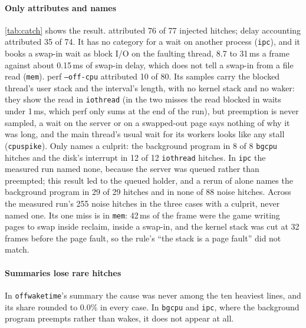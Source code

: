 \paragraph{Only \sys attributes and names} \autoref{tab:catch} shows the
result. \sys attributed 76 of 77 injected hitches; delay accounting
attributed 35 of 74. It has no category for a wait on another process
(\texttt{ipc}), and it books a swap-in wait as block I/O on the faulting
thread, 8.7 to 31\,ms a frame against about 0.15\,ms of swap-in delay, which
does not tell a swap-in from a file read (\texttt{mem}). perf
\texttt{--off-cpu} attributed 10 of 80. Its samples carry the blocked
thread's user stack and the interval's length, with no kernel stack and no
waker: they show the read in \texttt{iothread} (in the two misses the read
blocked in waits under 1\,ms, which perf only sums at the end of the run),
but preemption is never sampled, a wait on the server or on a swapped-out
page says nothing of why it was long, and the main thread's usual wait for
its workers looks like any stall (\texttt{cpuspike}). Only \sys names a
culprit: the background program in 8 of 8 \texttt{bgcpu} hitches and the
disk's interrupt in 12 of 12 \texttt{iothread} hitches. In \texttt{ipc} the
measured run named none, because the server was queued rather than
preempted; this result led to the queued holder, and a rerun of \sys alone
names the background program in 29 of 29 hitches and in none of 88 noise
hitches. Across the measured run's 255 noise hitches in the three cases
with a culprit, \sys never named one. Its one miss is in \texttt{mem}: 42\,ms
of the frame were the game writing pages to swap inside reclaim, inside a
swap-in, and the kernel stack was cut at 32 frames before the page fault,
so the rule's ``the stack is a page fault'' did not match.

\paragraph{Summaries lose rare hitches} In \texttt{offwaketime}'s summary
the cause was never among the ten heaviest lines, and its share rounded to
0.0\% in every case. In \texttt{bgcpu} and \texttt{ipc}, where the
background program preempts rather than wakes, it does not appear at all.


